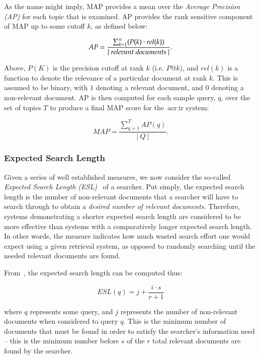 As the name might imply, MAP provides a mean over the \emph{Average Precision (AP)} for each topic that is examined. AP provides the rank sensitive component of MAP up to some cutoff $k$, as defined below:

\begin{equation*}
AP = \frac{\sum^{n}_{k=1}(P(k) \cdot rel(k))}{|~\text{\emph{relevant documents}}~|}.
\end{equation*}

Above, $P(K)$ is the precision cutoff at rank $k$ (i.e. $P@k$), and $rel(k)$ is a function to denote the relevance of a particular document at rank $k$. This is assumed to be binary, with $1$ denoting a relevant document, and $0$ denoting a non-relevant document. AP is then computed for each sample query, $q$, over the set of topics $T$ to produce a final MAP score for the~\gls{acr:ir} system:

\begin{equation*}
MAP = \frac{\sum^{T}_{q=1} AP(q)}{|~Q~|}.
\end{equation*}

\subsubsection{Expected Search Length}\label{sec:ir_background:evaluation:esl}
Given a series of well established measures, we now consider the so-called \emph{Expected Search Length (ESL)}~\citep{cooper1968expected_search_length} of a searcher. Put simply, the expected search length is the number of non-relevant documents that a searcher will have to search through to obtain a \emph{desired number of relevant documents.} Therefore, systems demonstrating a shorter expected search length are considered to be more effective than systems with a comparatively longer expected search length. In other words, the measure indicates how much wasted search effort one would expect using a given retrieval system, as opposed to randomly searching until the needed relevant documents are found.

From~\cite{cooper1968expected_search_length}, the expected search length can be computed thus:

\begin{equation*}
ESL(q) = j + \frac{i \cdot s}{r + 1}
\end{equation*}

\noindent
where $q$ represents some query, and $j$ represents the number of non-relevant documents when considered to query $q$. This is the minimum number of documents that must be found in order to satisfy the searcher's information need -- this is the minimum number before $s$ of the $r$ total relevant documents are found by the searcher.

